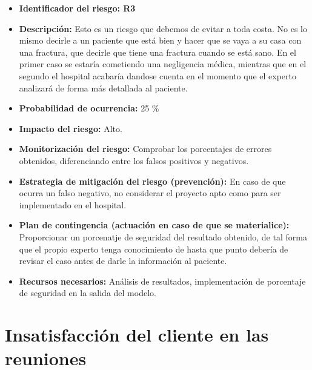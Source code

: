 \begin{itemize}
	\item \textbf{Identificador del riesgo: R3 }
	\item \textbf{Descripción:} Esto es un riesgo que debemos de evitar a toda costa. No es lo mismo decirle a un paciente que está bien y hacer que se vaya a su casa con una fractura, que decirle que tiene una fractura cuando se está sano. En el primer caso se estaría cometiendo una negligencia médica, mientras que en el segundo el hospital acabaría dandose cuenta en el momento que el experto analizará de forma más detallada al paciente. 
	\item \textbf{Probabilidad de ocurrencia: } 25 \%
	\item \textbf{Impacto del riesgo: } Alto.
	\item \textbf{Monitorización del riesgo: } Comprobar los porcentajes de errores obtenidos, diferenciando entre los falsos positivos y negativos. 
	\item \textbf{Estrategia de mitigación del riesgo (prevención): } En caso de que ocurra un falso negativo, no considerar el proyecto apto como para ser implementado en el hospital.
	\item \textbf{Plan de contingencia (actuación en caso de que se materialice): } Proporcionar un porcenatje de seguridad del resultado obtenido, de tal forma que el propio experto tenga conocimiento de hasta que punto debería de revisar el caso antes de darle la información al paciente. 
	\item \textbf{Recursos necesarios: }  Análisis de resultados, implementación de porcentaje de seguridad en la salida del modelo.
\end{itemize}

\section{Insatisfacción del cliente en las reuniones}

